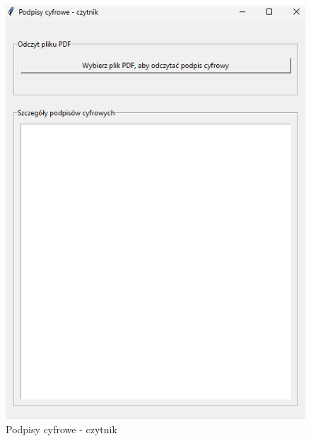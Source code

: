 \documentclass[12pt,a4paper]{article}
\begin{document}
\begin{figure}[!htb]
\begin{center}
\includegraphics[scale=0.45]{pictures/podpisy.png}
\caption{Podpisy cyfrowe - czytnik}
\label{fig:Podpisy cyfrowe - czytnik}
\end{center}
\end{figure}
\end{document}
